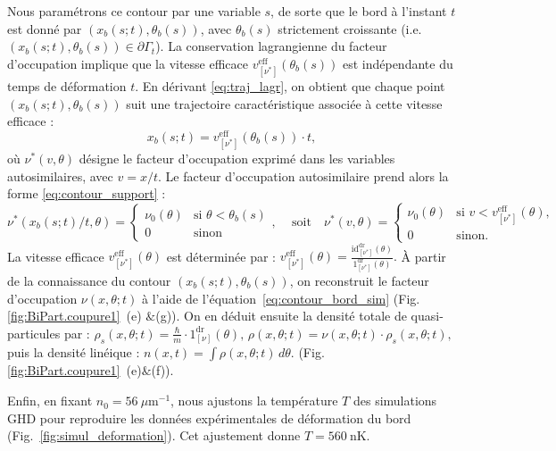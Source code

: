 Nous paramétrons ce contour par une variable \(s\), de sorte que le bord à l’instant \(t\) est donné par \((x_b(s;t), \theta_b(s))\), avec \(\theta_b(s)\) strictement croissante (i.e. \((x_b(s;t), \theta_b(s)) \in \partial \Gamma_t\)).  
La conservation lagrangienne du facteur d’occupation implique que la vitesse efficace \(v^{\mathrm{eff}}_{[\nu^\ast]}(\theta_b(s))\) est indépendante du temps de déformation \(t\).  
En dérivant \eqref{eq:traj_lagr}, on obtient que chaque point \((x_b(s;t), \theta_b(s))\) suit une trajectoire caractéristique associée à cette vitesse efficace :
\[
x_b(s;t) = v^{\mathrm{eff}}_{[\nu^\ast]}(\theta_b(s)) \cdot t,
\]
où \(\nu^\ast(v, \theta)\) désigne le facteur d’occupation exprimé dans les variables autosimilaires, avec \(v = x/t\).
Le facteur d’occupation autosimilaire prend alors la forme \eqref{eq:contour_support} :
\begin{equation}
\label{eq:contour_bord_sim}
\nu^\ast(x_b(s;t)/t,\theta)  =  	 \begin{cases} \nu_0(\theta) & \text{si }  \theta < \theta_b(s) \\ 0 & \text{sinon} \end{cases}, \, \quad \mbox{soit} \quad  	
\nu^\ast(v,\theta) = 
\begin{cases}
\nu_0(\theta) & \text{si }  v < v^{\mathrm{eff}}_{[\nu^\ast]}(\theta), \\
0 & \text{sinon} .
\end{cases}
\end{equation}
La vitesse efficace \(v^{\mathrm{eff}}_{[\nu^\ast]}(\theta)\) est déterminée par :
\(
v^{\mathrm{eff}}_{[\nu^\ast]}(\theta) = \frac{\mathrm{id}^{\mathrm{dr}}_{[\nu^\ast]}(\theta)}{\mathrm{1}^{\mathrm{dr}}_{[\nu^\ast]}(\theta)}.
\)
À partir de la connaissance du contour \((x_b(s;t), \theta_b(s))\), on reconstruit le facteur d’occupation \(\nu(x,\theta; t)\) à l’aide de l’équation~\eqref{eq:contour_bord_sim} (Fig. \ref{fig:BiPart.coupure1}~(e) $\&$(g)). On en déduit ensuite la densité totale de quasi-particules par :
\(
\rho_s(x,\theta;t) = \frac{\hbar}{m} \cdot 1^{\mathrm{dr}}_{[\nu]}(\theta),
\,
\rho(x,\theta;t) = \nu(x,\theta;t) \cdot \rho_s(x,\theta;t),
\)
puis la densité linéique :
\(
n(x,t) = \int \rho(x,\theta;t)\, d\theta.
\)
(Fig. \ref{fig:BiPart.coupure1}~(e)$\&$(f)).

\medskip 

Enfin, en fixant \(n_0 = 56~\mu\mathrm{m}^{-1}\), nous ajustons la température \(T\) des simulations GHD pour reproduire les données expérimentales de déformation du bord (Fig.~\ref{fig:simul_deformation}). Cet ajustement donne \(T = 560~\mathrm{nK}\).

